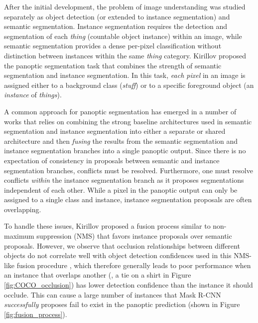 \documentclass[10pt,twocolumn,letterpaper]{article}
\begin{document}
After the initial development, the problem of image understanding was studied separately as object detection (or extended to instance segmentation) and semantic segmentation. Instance segmentation \cite{pinheiro2015learning,SharpMask,dai2015instance, liang2018proposal,he2017mask, riemenschneider2012hough,zhang2015instance,jin2016object} requires the detection and segmentation of each \textit{thing} (countable object instance) within an image, while semantic segmentation \cite{shotton2006textonboost, tu2008auto, everingham2010pascal,long2015fully, chen2018deeplab,zheng2015conditional,zhao2016pspnet} provides a dense per-pixel classification without distinction between instances within the same \textit{thing} category. Kirillov \etal \cite{kirillov2018panoptic} proposed the panoptic segmentation task that combines the strength of semantic segmentation and instance segmentation. In this task, \textit{each pixel} in an image is assigned either to a background class (\textit{stuff}) or to a specific foreground object (an \textit{instance} of \textit{things}). 

A common approach for panoptic segmentation has emerged in a number of works \cite{kirillov2019panoptic,li2018attention,xiong2019upsnet} that relies on combining the strong baseline architectures used in semantic segmentation and instance segmentation into either a separate or shared architecture and then \textit{fusing} the results from the semantic segmentation and instance segmentation branches into a single panoptic output. Since there is no expectation of consistency in proposals between semantic and instance segmentation branches, conflicts must be resolved. Furthermore, one must resolve conflicts \textit{within} the instance segmentation branch as it proposes segmentations independent of each other. While a pixel in the panoptic output can only be assigned to a single class and instance, instance segmentation proposals are often overlapping.

To handle these issues, Kirillov \etal \cite{kirillov2018panoptic} proposed a fusion process similar to non-maximum suppression (NMS) that favors instance proposals over semantic proposals. However, we observe that occlusion relationships between different objects do not correlate well with object detection confidences used in this NMS-like fusion procedure \cite{kirillov2018panoptic}, which therefore generally leads to poor performance when an instance that overlaps another (\eg, a tie on a shirt in Figure \ref{fig:COCO_occlusion}) has lower detection confidence than the instance it should occlude. This can cause a large number of instances that Mask R-CNN \textit{successfully} proposes fail to exist in the panoptic prediction (shown in Figure \ref{fig:fusion_process}). 
\end{document}
